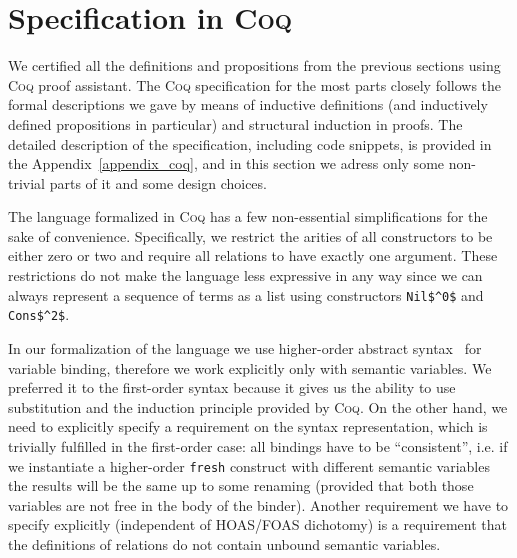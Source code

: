 \section{Specification in \textsc{Coq}}
\label{specification}

We certified all the definitions and propositions from the previous sections using \textsc{Coq} proof assistant. The \textsc{Coq} specification for the most parts closely follows the formal descriptions we gave by means of inductive definitions (and inductively defined propositions in particular) and structural induction in proofs. The detailed description of the specification, including code snippets, is provided in the Appendix~\ref{appendix_coq}, and in this section we adress only some non-trivial parts of it and some design choices.

The language formalized in \textsc{Coq} has a few non-essential simplifications for the sake of convenience. Specifically, we restrict the arities of all constructors to be either zero or two and require all relations to have exactly one argument. These restrictions do not make the language less expressive in any way since we can always represent a sequence of terms as a list using constructors \lstinline|Nil$^0$| and \lstinline|Cons$^2$|. 

In our formalization of the language we use higher-order abstract syntax~\cite{HOAS} for variable binding, therefore we work explicitly only with semantic variables. We preferred it to the first-order syntax because it gives us the ability to use substitution and the induction principle provided by \textsc{Coq}. On the other hand, we need to explicitly specify a requirement on the syntax representation, which is trivially fulfilled in the first-order case: all bindings have to be ``consistent'', i.e. if we instantiate a higher-order \lstinline|fresh| construct with different semantic variables the results will be the same up to some renaming (provided that both those variables are not free in the body of the binder). Another requirement we have to specify explicitly (independent of HOAS/FOAS dichotomy) is a requirement that the definitions of relations do not contain unbound semantic variables.

